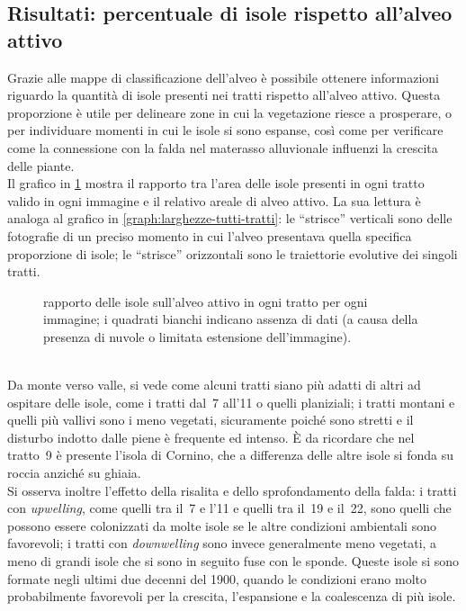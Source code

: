 \subsection{Risultati: percentuale di isole rispetto all'alveo attivo}
Grazie alle mappe di classificazione dell'alveo è possibile ottenere informazioni riguardo la quantità di isole presenti nei tratti rispetto all'alveo attivo.
Questa proporzione è utile per delineare zone in cui la vegetazione riesce a prosperare, o per individuare momenti in cui le isole si sono espanse, così come per verificare come la connessione con la falda nel materasso alluvionale influenzi la crescita delle piante.
\\
Il grafico in \cref{graph:rapp-isl-tutti-tratti} mostra il rapporto tra l'area delle isole presenti in ogni tratto valido in ogni immagine e il relativo areale di alveo attivo.
La sua lettura è analoga al grafico in \cref{graph:larghezze-tutti-tratti}: le “strisce” verticali sono delle fotografie di un preciso momento in cui l'alveo presentava quella specifica proporzione di isole; le “strisce” orizzontali sono le traiettorie evolutive dei singoli tratti.
%
\begin{figure}
	\centering
	
	\caption[rapporto delle isole sull'alveo attivo in ogni tratto per ogni immagine]{rapporto delle isole sull'alveo attivo in ogni tratto per ogni immagine; i quadrati bianchi indicano assenza di dati (a causa della presenza di nuvole o limitata estensione dell'immagine).}
	\label{graph:rapp-isl-tutti-tratti}
\end{figure}
%
\\
Da monte verso valle, si vede come alcuni tratti siano più adatti di altri ad ospitare delle isole, come i tratti dal~7 all'11 o quelli planiziali;
i tratti montani e quelli più vallivi sono i meno vegetati, sicuramente poiché sono stretti e il disturbo indotto dalle piene è frequente ed intenso.
È da ricordare che nel tratto~9 è presente l'isola di Cornino, che a differenza delle altre isole si fonda su roccia anziché su ghiaia.
\\
Si osserva inoltre l'effetto della risalita e dello sprofondamento della falda:
i tratti con \emph{upwelling}, come quelli tra il~7 e l'11 e quelli tra il~19 e il~22, sono quelli che possono essere colonizzati da molte isole se le altre condizioni ambientali sono favorevoli; i tratti con \emph{downwelling} sono invece generalmente meno vegetati, a meno di grandi isole che si sono in seguito fuse con le sponde. Queste isole si sono formate negli ultimi due decenni del 1900, quando le condizioni erano molto probabilmente favorevoli per la crescita, l'espansione e la coalescenza di più isole.

